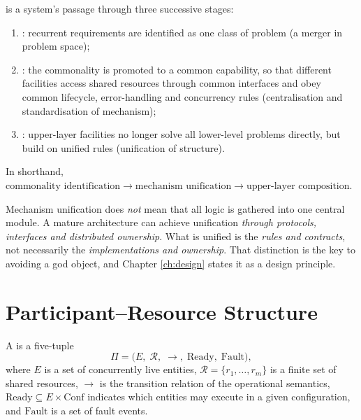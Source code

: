 \begin{definition}\label{def:infra}
 is a system's passage through three successive
stages:
\begin{enumerate}[label=(\roman*)]
\item {}: recurrent requirements are identified as one class
      of problem (a merger in problem space);
\item {}: the commonality is promoted to a common capability, so
      that different facilities access shared resources through common interfaces and obey
      common lifecycle, error-handling and concurrency rules (centralisation and
      standardisation of mechanism);
\item {}: upper-layer facilities no longer solve all lower-level
      problems directly, but build on unified rules (unification of structure).
\end{enumerate}
In shorthand,
{\small$\boxed{\text{commonality identification} \to \text{mechanism unification} \to
\text{upper-layer composition}}$}.
\end{definition}

Mechanism unification does \emph{not} mean that all logic is gathered into one central
module. A mature architecture can achieve unification \emph{through protocols, interfaces
and distributed ownership}. What is unified is the \emph{rules and contracts}, not
necessarily the \emph{implementations and ownership}. That distinction is the key to
avoiding a god object, and Chapter \ref{ch:design} states it as a design principle.

\section{Participant--Resource Structure}\label{sec:participant}

\begin{definition}\label{def:pr-structure}
A  is a five-tuple
\begin{equation}\label{eq:pr}
\Pi = \bigl(E,\; \mathcal{R},\; \to,\; \mathrm{Ready},\; \mathrm{Fault}\bigr),
\end{equation}
where $E$ is a set of concurrently live entities,
$\mathcal{R} = \{r_1,\dots,r_m\}$ is a finite set of shared resources, $\to$ is the
transition relation of the operational semantics,
$\mathrm{Ready} \subseteq E \times \mathrm{Conf}$ indicates which entities may execute in a
given configuration, and $\mathrm{Fault}$ is a set of fault events.
\end{definition}

